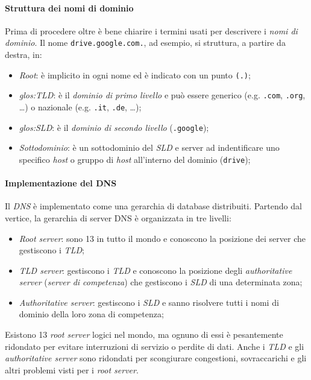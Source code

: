 \paragraph{Struttura dei nomi di dominio}
Prima di procedere oltre è bene chiarire i termini usati per descrivere i
\emph{nomi di dominio}. Il nome \texttt{drive.google.com.}, ad esempio, si
struttura, a partire da destra, in:
\begin{itemize}
    \item \emph{Root}: è implicito in ogni nome ed è indicato con un punto
    \texttt{(.)};
    \item \emph{\gls{glos:TLD}}: è il \emph{dominio di primo livello} e può
    essere generico (e.g. \texttt{.com}, \texttt{.org}, \dots) o nazionale (e.g.
    \texttt{.it}, \texttt{.de}, \dots);
    \item \emph{\gls{glos:SLD}}: è il \emph{dominio di secondo livello}
    (\texttt{.google});
    \item \emph{Sottodominio}: è un sottodominio del \emph{SLD} e server ad
    indentificare uno specifico \emph{host} o gruppo di \emph{host} all'interno
    del dominio (\texttt{drive});
\end{itemize}

\paragraph{Implementazione del DNS}
Il \emph{DNS} è implementato come una gerarchia di database distribuiti.
Partendo dal vertice, la gerarchia di server DNS è organizzata in tre livelli:
\begin{itemize}
    \item \emph{Root server}: sono 13 in tutto il mondo e conoscono la posizione
    dei server che gestiscono i \emph{TLD};
    \item \emph{TLD server}: gestiscono i \emph{TLD} e conoscono la posizione degli
    \emph{authoritative server} (\emph{server di competenza}) che gestiscono i
    \emph{SLD} di una determinata zona;
    \item \emph{Authoritative server}: gestiscono i \emph{SLD} e sanno risolvere
    tutti i nomi di dominio della loro zona di competenza;
\end{itemize}
Esistono 13 \emph{root server} logici nel mondo, ma ognuno di essi è pesantemente
ridondato per evitare interruzioni di servizio o perdite di dati. Anche i
\emph{TLD} e gli \emph{authoritative server} sono ridondati per scongiurare
congestioni, sovraccarichi e gli altri problemi visti per i \emph{root server}.

